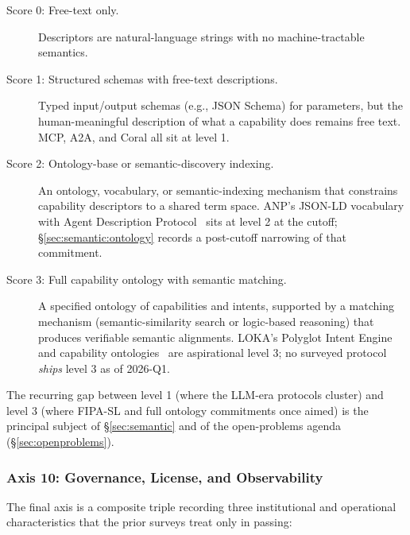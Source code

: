 \begin{description}
  \item[Score 0: Free-text only.] Descriptors are
    natural-language strings with no machine-tractable
    semantics.
  \item[Score 1: Structured schemas with free-text
    descriptions.] Typed input/output schemas (e.g.,
    JSON Schema) for parameters, but the human-meaningful
    description of what a capability does remains free
    text. MCP, A2A, and Coral all sit at level 1.
  \item[Score 2: Ontology-base or semantic-discovery
    indexing.] An ontology, vocabulary, or
    semantic-indexing mechanism that constrains
    capability descriptors to a shared term space.
    ANP's JSON-LD vocabulary with Agent Description
    Protocol~\cite{spec_anp} sits at level 2 at the
    cutoff; \S\ref{sec:semantic:ontology} records a
    post-cutoff narrowing of that commitment.
  \item[Score 3: Full capability ontology with
    semantic matching.] A specified ontology of
    capabilities and intents, supported by a matching
    mechanism (semantic-similarity search or
    logic-based reasoning) that produces verifiable
    semantic alignments. LOKA's Polyglot Intent Engine
    and capability ontologies~\cite{spec_loka} are
    aspirational level 3; no surveyed protocol
    \emph{ships} level 3 as of 2026-Q1.
\end{description}

The recurring gap between level 1 (where the LLM-era
protocols cluster) and level 3 (where FIPA-SL and full
ontology commitments once aimed) is the principal subject
of \S\ref{sec:semantic} and of the open-problems
agenda (\S\ref{sec:openproblems}).

\subsubsection{Axis 10: Governance, License, and Observability}
\label{sec:rubric:axis10}

The final axis is a composite triple recording three
institutional and operational characteristics that the
prior surveys treat only in passing:

